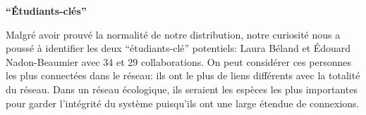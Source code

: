 \documentclass[9pt,twocolumn,twoside,]{pnas-new}
\begin{document}
\textbf{``Étudiants-clés''}

Malgré avoir prouvé la normalité de notre distribution, notre curiosité
nous a poussé à identifier les deux ``étudiants-clé'' potentiels: Laura
Béland et Édouard Nadon-Beaumier avec 34 et 29 collaborations. On peut
considérer ces personnes les plus connectées dans le réseau: ils ont le
plus de liens différents avec la totalité du réseau. Dans un réseau
écologique, ils seraient les espèces les plus importantes pour garder
l'intégrité du système puisqu'ils ont une large étendue de connexions.



% 
\end{document}
